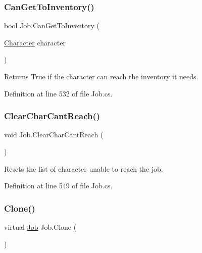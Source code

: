 \mbox{\label{class_job_a5dda43629c29e13b94b6faeb6380e572}} 
\subsubsection{\texorpdfstring{Can\+Get\+To\+Inventory()}{CanGetToInventory()}}
{\footnotesize\ttfamily bool Job.\+Can\+Get\+To\+Inventory (\begin{DoxyParamCaption}\item[{\hyperlink{class_project_porcupine_1_1_entities_1_1_character}{Character}}]{character }\end{DoxyParamCaption})}





\begin{DoxyReturn}{Returns}
True if the character can reach the inventory it needs.
\end{DoxyReturn}


Definition at line 532 of file Job.\+cs.

\mbox{\label{class_job_ae8040a01c1ba22f4e108eb623adce4b5}} 
\subsubsection{\texorpdfstring{Clear\+Char\+Cant\+Reach()}{ClearCharCantReach()}}
{\footnotesize\ttfamily void Job.\+Clear\+Char\+Cant\+Reach (\begin{DoxyParamCaption}{ }\end{DoxyParamCaption})}



Resets the list of character unable to reach the job. 



Definition at line 549 of file Job.\+cs.

\mbox{\label{class_job_a76133c61d72b667905bef919a50b8c34}} 
\subsubsection{\texorpdfstring{Clone()}{Clone()}}
{\footnotesize\ttfamily virtual \hyperlink{class_job}{Job} Job.\+Clone (\begin{DoxyParamCaption}{ }\end{DoxyParamCaption})\hspace{0.3cm}{\ttfamily [virtual]}}




